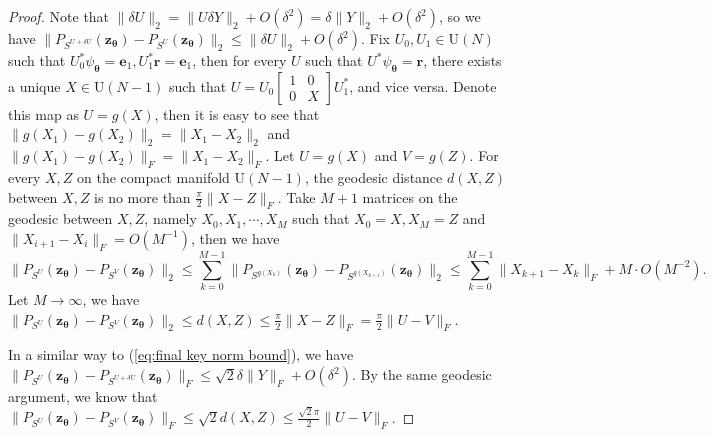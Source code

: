 \documentclass[10pt,a4paper]{amsart}
\begin{document}
\begin{proof}
Note that $\|\delta U\|_2=\|U\delta Y\|_2+O(\delta^2)=\delta\|Y\|_2+O(\delta^2)$, so we have $\|P_{S^{U+\delta U}}(\bm{z}_{\bm\theta})-P_{S^U}(\bm{z}_{\bm\theta})\|_2\leq\|\delta U\|_2+O(\delta^2)$. Fix $U_0,U_1\in \mathrm U(N)$ such that $U_0^*\psi_{\bm\theta}=\bm e_1,U_1^*\bm r=\bm e_1$, then for every $U$ such that  $U^*\psi_{\bm\theta}=\bm r$, there exists a unique $X\in \mathrm U(N-1)$ such that $U=U_0\begin{bmatrix}
    1&0\\
    0& X
\end{bmatrix}U_1^*$, and vice versa. Denote this map as $U=g(X)$, then it is easy to see that $\|g(X_1)-g(X_2)\|_2=\|X_1-X_2\|_2$ and $\|g(X_1)-g(X_2)\|_F=\|X_1-X_2\|_F$. Let $U=g(X)$ and $V=g(Z)$.
For every $X,Z$ on the compact manifold $\mathrm U(N-1)$, the geodesic distance $d(X,Z)$ between $X,Z$ is no more than $\frac{\pi}{2}\|X-Z\|_F$. Take $M+1$ matrices on the geodesic between $X,Z$, namely $X_0,X_1,\cdots,X_{M}$ such that $X_0=X,X_{M}=Z$ and $\|X_{i+1}-X_i\|_F=O(M^{-1})$, then we have  
\[\|P_{S^U}(\bm z_{\bm\theta})-P_{S^V}(\bm z_{\bm\theta})\|_2\leq\sum\limits_{k=0}^{M-1}\|P_{S^{g(X_k)}}(\bm z_{\bm\theta})-P_{S^{g(X_{k+1})}}(\bm z_{\bm\theta})\|_2\leq \sum\limits_{k=0}^{M-1}\|X_{k+1}-X_{k}\|_F+M\cdot O(M^{-2}).\]
Let $M\to\infty$, we have $\|P_{S^U}(\bm z_{\bm\theta})-P_{S^V}(\bm z_{\bm\theta})\|_2\leq d(X,Z)\leq \frac{\pi}{2} \|X-Z\|_F=\frac{\pi}{2}\|U-V\|_F$.

In a similar way to (\ref{eq:final key norm bound}), we have $\|P_{S^U}(\bm z_{\bm\theta})-P_{S^{U+\delta U}}(\bm z_{\bm\theta})\|_F\leq \sqrt{2}\delta \|Y\|_F+O(\delta^2)$. By the same geodesic argument, we know that $\|P_{S^U}(\bm z_{\bm\theta})-P_{S^V}(\bm z_{\bm\theta})\|_F\leq \sqrt{2}d(X,Z)\leq\frac{\sqrt{2}\pi}{2}\|U-V\|_F$. 
\end{proof}
\end{document}

